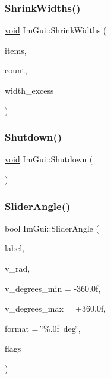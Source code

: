\subsubsection{\texorpdfstring{Shrink\+Widths()}{ShrinkWidths()}}
{\footnotesize\ttfamily \hyperlink{imgui__impl__opengl3__loader_8h_ac668e7cffd9e2e9cfee428b9b2f34fa7}{void} Im\+Gui\+::\+Shrink\+Widths (\begin{DoxyParamCaption}\item[{\hyperlink{structImGuiShrinkWidthItem}{Im\+Gui\+Shrink\+Width\+Item} $\ast$}]{items,  }\item[{int}]{count,  }\item[{float}]{width\+\_\+excess }\end{DoxyParamCaption})}

\mbox{\label{namespaceImGui_aeba34069558d4fbcf734a9c92ce3b773}} 
\subsubsection{\texorpdfstring{Shutdown()}{Shutdown()}}
{\footnotesize\ttfamily \hyperlink{imgui__impl__opengl3__loader_8h_ac668e7cffd9e2e9cfee428b9b2f34fa7}{void} Im\+Gui\+::\+Shutdown (\begin{DoxyParamCaption}{ }\end{DoxyParamCaption})}

\mbox{\label{namespaceImGui_acd162f7732c5c7be7b8651d7e43bb979}} 
\subsubsection{\texorpdfstring{Slider\+Angle()}{SliderAngle()}}
{\footnotesize\ttfamily bool Im\+Gui\+::\+Slider\+Angle (\begin{DoxyParamCaption}\item[{const char $\ast$}]{label,  }\item[{float $\ast$}]{v\+\_\+rad,  }\item[{float}]{v\+\_\+degrees\+\_\+min = {\ttfamily -\/360.0f},  }\item[{float}]{v\+\_\+degrees\+\_\+max = {\ttfamily +360.0f},  }\item[{const char $\ast$}]{format = {\ttfamily \char`\"{}\%.0f~deg\char`\"{}},  }\item[{Im\+Gui\+Slider\+Flags}]{flags = {} }\end{DoxyParamCaption})}

